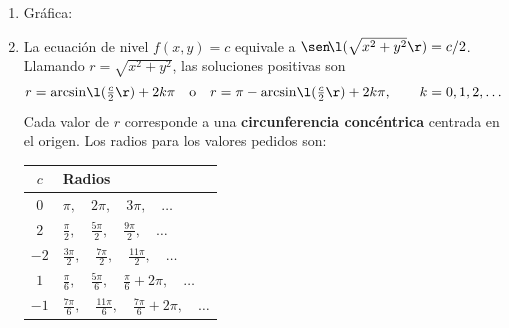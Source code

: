 \documentclass[11pt,respuestas,a4]{aleph-examen}
\begin{document}
\begin{preguntas}
\begin{respuesta}
\begin{enumerate}
    \item Gráfica:
    \begin{center}
    \end{center}

    \item La ecuación de nivel $f(x,y)=c$ equivale a $\sen\!\l(\sqrt{x^2+y^2}\r)=c/2$.
    Llamando $r=\sqrt{x^2+y^2}$, las soluciones positivas son
    \[
        r = \arcsin\!\l(\tfrac{c}{2}\r)+2k\pi \quad\text{o}\quad
        r = \pi-\arcsin\!\l(\tfrac{c}{2}\r)+2k\pi, \qquad k=0,1,2,\ldots
    \]
    Cada valor de $r$ corresponde a una \textbf{circunferencia concéntrica} centrada en el origen. Los radios para los valores pedidos son:
    \begin{center}
    \begin{tabular}{|c|l|}
    \hline
    $c$ & Radios \\
    \hline
    $0$  & $\pi,\quad 2\pi,\quad 3\pi,\quad \ldots$ \\
    $2$  & $\tfrac{\pi}{2},\quad \tfrac{5\pi}{2},\quad \tfrac{9\pi}{2},\quad \ldots$ \\
    $-2$ & $\tfrac{3\pi}{2},\quad \tfrac{7\pi}{2},\quad \tfrac{11\pi}{2},\quad \ldots$ \\
    $1$  & $\tfrac{\pi}{6},\quad \tfrac{5\pi}{6},\quad \tfrac{\pi}{6}+2\pi,\quad \ldots$ \\
    $-1$ & $\tfrac{7\pi}{6},\quad \tfrac{11\pi}{6},\quad \tfrac{7\pi}{6}+2\pi,\quad \ldots$ \\
    \hline
    \end{tabular}
    \end{center}


\end{enumerate}
\end{respuesta}
\end{preguntas}
\end{document}
